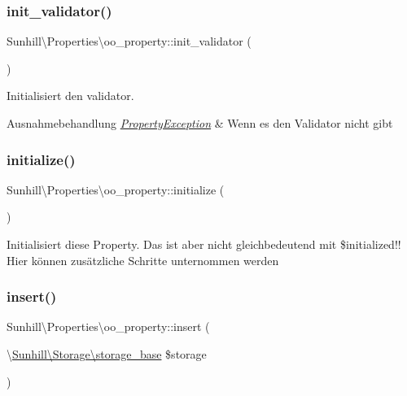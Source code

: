 \subsubsection{\texorpdfstring{init\+\_\+validator()}{init\_validator()}}
{\footnotesize\ttfamily Sunhill\textbackslash{}\+Properties\textbackslash{}oo\+\_\+property\+::init\+\_\+validator (\begin{DoxyParamCaption}{ }\end{DoxyParamCaption})\hspace{0.3cm}{\ttfamily [protected]}}

Initialisiert den validator. 
\begin{DoxyExceptions}{Ausnahmebehandlung}
{\em \hyperlink{classSunhill_1_1Properties_1_1PropertyException}{Property\+Exception}} & Wenn es den Validator nicht gibt \\
\hline
\end{DoxyExceptions}
\mbox{\label{classSunhill_1_1Properties_1_1oo__property_a07ec1ce77d7088128eda4a39d30679dd}} 
\subsubsection{\texorpdfstring{initialize()}{initialize()}}
{\footnotesize\ttfamily Sunhill\textbackslash{}\+Properties\textbackslash{}oo\+\_\+property\+::initialize (\begin{DoxyParamCaption}{ }\end{DoxyParamCaption})}

Initialisiert diese Property. Das ist aber nicht gleichbedeutend mit \$initialized!! Hier können zusätzliche Schritte unternommen werden \mbox{\label{classSunhill_1_1Properties_1_1oo__property_acca4c814d5066bd0906952090dd0cfa8}} 
\subsubsection{\texorpdfstring{insert()}{insert()}}
{\footnotesize\ttfamily Sunhill\textbackslash{}\+Properties\textbackslash{}oo\+\_\+property\+::insert (\begin{DoxyParamCaption}\item[{\textbackslash{}\hyperlink{classSunhill_1_1Storage_1_1storage__base}{Sunhill\textbackslash{}\+Storage\textbackslash{}storage\+\_\+base}}]{\$storage }\end{DoxyParamCaption})}

